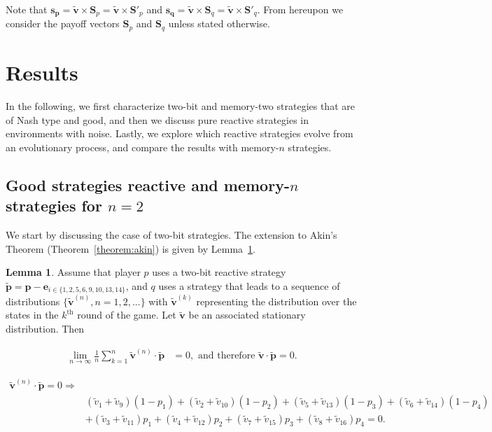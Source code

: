 \documentclass{article}
\theoremstyle{definition}
\newtheorem{lemma}[theorem]{Lemma}
\begin{document}
Note that \(\mathbf{s_{p}} = \mathbf{\tilde{v}} \times \mathbf{S}_{p} =
\mathbf{\tilde{v}} \times \mathbf{S}'_{p}\) and \(\mathbf{s_{q}} =\mathbf{\tilde{v}}
\times \mathbf{S}_{q} = \mathbf{\tilde{v}} \times \mathbf{S}'_{q}\). From
hereupon we consider the payoff vectors \(\mathbf{S}_{p}\) and
\(\mathbf{S}_{q}\) unless stated otherwise.

\section{Results}\label{section:results}

In the following, we first characterize two-bit and memory-two strategies that
are of Nash type and good, and then we discuss pure reactive strategies in
environments with noise. Lastly, we explore which reactive strategies evolve
from an evolutionary process, and compare the results with memory-\(n\)
strategies.

\subsection{Good strategies reactive and memory-\(n\) strategies for
\(n=2\)}\label{section:good_nash_strategies}

We start by discussing the case of two-bit strategies. The extension to Akin's
Theorem (Theorem~\ref{theorem:akin}) is given by Lemma~\ref{lemma:akin_extended}.

\begin{lemma}\label{lemma:akin_extended}
  Assume that player \(p\) uses a two-bit reactive strategy \(\mathbf{\tilde{p}} = \mathbf{p} - \mathbf{e}_{i \in \{1, 2,
  5, 6, 9, 10, 13, 14\}}\), and \(q\) uses a strategy that leads to a sequence
  of distributions \(\{\mathbf{\tilde{v}}^{(n)}, n = 1, 2, ...\}\) with
  \(\mathbf{\tilde{v}}^{(k)}\) representing the distribution over the states in the
  \(k^{\text{th}}\) round of the game. Let \(\mathbf{\tilde{v}}\) be an associated
  stationary distribution. Then

  \begin{align*}
    \lim_{n \rightarrow \infty} \frac{1}{n} \sum_{k=1}^{n} \mathbf{\tilde{v}}^{(n)} \cdot\mathbf{\tilde{p}} & = 0, \text{ and therefore } \mathbf{\tilde{v}} \cdot \mathbf{\tilde{p}} = 0.
  \end{align*}

  \begin{align}\label{eq:akin_extended}
  \mathbf{\tilde{v}}^{(n)} \cdot \mathbf{\tilde{p}} = 0 \Rightarrow & \nonumber \\
  & (\tilde{v}_{1} + \tilde{v}_{9}) (1 - p_1) + (\tilde{v}_{2} + \tilde{v}_{10}) (1 - p_2)  + (\tilde{v}_{5} + \tilde{v}_{13}) (1 - p_3) + (\tilde{v}_{6} + \tilde{v}_{14}) (1 - p_4) \nonumber \\
  & + (\tilde{v}_{3} + \tilde{v}_{11})p_1  + (\tilde{v}_{4} + \tilde{v}_{12})p_2 + (\tilde{v}_{7} + \tilde{v}_{15}) p_3 + (\tilde{v}_{8} + \tilde{v}_{16}) p_4 = 0.
  \end{align}
\end{lemma}
\end{document}
